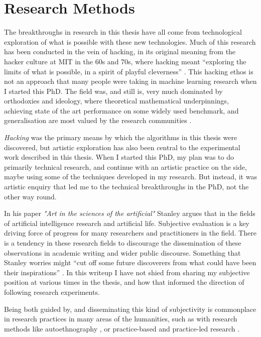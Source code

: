 \section{Research Methods}

The breakthroughs in research in this thesis have all come from technological exploration of what is possible with these new technologies. Much of this research has been conducted in the vein of hacking, in its original meaning from the hacker culture at MIT in the 60s and 70s, where hacking meant “exploring the limits of what is possible, in a spirit of playful cleverness” \citep{stallman2002hacking}. 
This hacking ethos is not an approach that many people were taking in machine learning research when I started this PhD. 
The field was, and still is, very much dominated by orthodoxies and ideology, where theoretical mathematical underpinnings, achieving state of the art performance on some widely used benchmark, and generalisation are most valued by the research communities \citep{birhane2022values}.

\textit{Hacking} was the primary means by which the algorithms in this thesis were discovered, but artistic exploration has also been central to the experimental work described in this thesis. 
When I started this PhD, my plan was to do primarily technical research, and continue with an artistic practice on the side, maybe using some of the techniques developed in my research. 
But instead, it was artistic enquiry that led me to the technical breakthroughs in the PhD, not the other way round. 

In his paper \textit{"Art in the sciences of the artificial"} Stanley argues that in the fields of artificial intelligence research and artificial life. 
Subjective evaluation is a key driving force of progress for many researchers and practitioners in the field. 
There is a tendency in these research fields to discourage the dissemination of these observations in academic writing and wider public discourse. 
Something that Stanley worries might “cut off some future discoverers from what could have been their inspirations” \citep{stanley2018art}. 
In this writeup I have not shied from sharing my subjective position at various times in the thesis, and how that informed the direction of following research experiments.

Being both guided by, and disseminating this kind of subjectivity is commonplace in research practices in many areas of the humanities, such as with research methods like autoethnography \citep{reed1997auto}, or practice-based and practice-led research \citep{candy2006practice}. 


